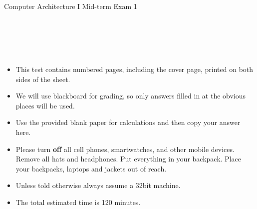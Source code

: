 \documentclass[addpoints, 12pt]{exam}
\begin{document}
\begin{center}

{\centering \Large Computer Architecture I Mid-term Exam 1\\\vspace{.75cm}}


\vspace{0.1cm}
\\[0.6cm]
\\[0.6cm]
\\[0.6cm]
\\[0.5cm]


\begin{multicols}{2}
\gradetable
\columnbreak

\begin{itemize}
\item This test contains \pageref{LastPage} numbered pages, including the cover page, printed on both sides of the sheet.
\item We will use blackboard for grading, so only answers filled in at the obvious places will be used.
\item Use the provided blank paper for calculations and then copy your answer here.
\item Please turn \textbf{off} all cell phones, smartwatches, and other mobile devices. Remove all hats and headphones. Put everything in your backpack. Place your backpacks, laptops and jackets out of reach.
\item Unless told otherwise always assume a 32bit machine.
\item The total estimated time is 120 minutes.

\end{itemize}




\end{multicols}

\begin{itemize}


\end{itemize}
\end{center}
\end{document}
